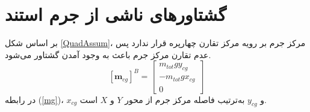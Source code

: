 \section{گشتاورهای ناشی از جرم استند}
بر اساس شکل
\ref{QuadAssum}،
مرکز جرم بر رویه مرکز تقارن چهارپره قرار ندارد پس عدم تقارن مرکز جرم باعث به وجود آمدن گشتاور می‌شود.
\begin{equation}\label{mg}
	[\boldsymbol m_ {cg}]^B = \begin{bmatrix}
		m_{tot}gy_{cg} \\
		-m_{tot}gx_{cg} \\
		0
	\end{bmatrix}
\end{equation}
در رابطه
(\ref{mg})،
$x_{cg}$
و
$y_{cg}$
به‌ترتیب فاصله مرکز جرم از محور $Y$ و $X$ است.